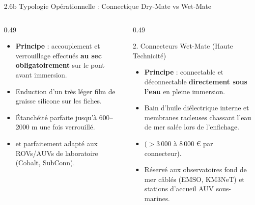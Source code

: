 \begin{frame}{2.6b Typologie Opérationnelle : Connectique Dry-Mate vs Wet-Mate}
  \begin{columns}[T]
    \begin{column}{0.49\textwidth}
      \begin{block}{}
        \scriptsize
        \begin{itemize}
          \item \textbf{Principe} : accouplement et verrouillage effectués \textbf{au sec obligatoirement} sur le pont avant immersion.
          \item Enduction d'un très léger film de graisse silicone sur les fiches.
          \item Étanchéité parfaite jusqu'à 600--2000 m une fois verrouillé.
          \item {} et parfaitement adapté aux ROVs/AUVs de laboratoire (Cobalt, SubConn).
        \end{itemize}
      \end{block}
    \end{column}

    \begin{column}{0.49\textwidth}
      \begin{alertblock}{2. Connecteurs Wet-Mate (Haute Technicité)}
        \scriptsize
        \begin{itemize}
          \item \textbf{Principe} : connectable et déconnectable \textbf{directement sous l'eau} en pleine immersion.
          \item Bain d'huile diélectrique interne et membranes racleuses chassant l'eau de mer salée lors de l'enfichage.
          \item {} ($>3\,000$ à $8\,000$ € par connecteur).
          \item Réservé aux observatoires fond de mer câblés (EMSO, KM3NeT) et stations d'accueil AUV sous-marines.
        \end{itemize}
      \end{alertblock}
    \end{column}
  \end{columns}
\end{frame}


